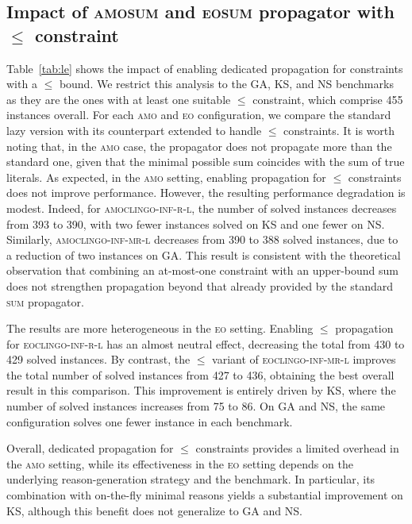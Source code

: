 \documentclass[preprint,authoryear]{elsarticle}
\newcommand{\amoclingoinfrlazy}{\textsc{amoclingo-inf-r-l}\xspace}
\newcommand{\amoclingoinfmrlazy}{\textsc{amoclingo-inf-mr-l}\xspace}
\newcommand{\eoclingoinfrlazy}{\textsc{eoclingo-inf-r-l}\xspace}
\newcommand{\eoclingoinfmrlazy}{\textsc{eoclingo-inf-mr-l}\xspace}
\theoremstyle{definition}
\begin{document}
{\color{blue}
\subsection{Impact of \textsc{amosum} and \textsc{eosum} propagator with $\le$ constraint}
Table~\ref{tab:le} shows the impact of enabling dedicated propagation for constraints with a $\le$ bound. We restrict this analysis to the GA, KS, and NS benchmarks as they are the ones with at least one suitable $\le$ constraint, which comprise 455 instances overall. For each \textsc{amo} and \textsc{eo} configuration, we compare the standard lazy version with its counterpart extended to handle $\le$ constraints.
It is worth noting that, in the \textsc{amo} case, the propagator does not propagate more than the standard one, given that the minimal possible sum coincides with the sum of true literals.
As expected, in the \textsc{amo} setting, enabling propagation for $\le$ constraints does not improve performance. 
However, the resulting performance degradation is modest.
Indeed, for \amoclingoinfrlazy, the number of solved instances decreases from 393 to 390, with two fewer instances solved on KS and one fewer on NS. Similarly, \amoclingoinfmrlazy decreases from 390 to 388 solved instances, due to a reduction of two instances on GA. This result is consistent with the theoretical observation that combining an at-most-one constraint with an upper-bound sum does not strengthen propagation beyond that already provided by the standard \textsc{sum} propagator.

The results are more heterogeneous in the \textsc{eo} setting. Enabling $\le$ propagation for \eoclingoinfrlazy has an almost neutral effect, decreasing the total from 430 to 429 solved instances. By contrast, the $\le$ variant of \eoclingoinfmrlazy improves the total number of solved instances from 427 to 436, obtaining the best overall result in this comparison. This improvement is entirely driven by KS, where the number of solved instances increases from 75 to 86. On GA and NS, the same configuration solves one fewer instance in each benchmark.

Overall, dedicated propagation for $\le$ constraints provides a limited overhead in the \textsc{amo} setting, while its effectiveness in the \textsc{eo} setting depends on the underlying reason-generation strategy and the benchmark. In particular, its combination with on-the-fly minimal reasons yields a substantial improvement on KS, although this benefit does not generalize to GA and NS.
}
\end{document}
